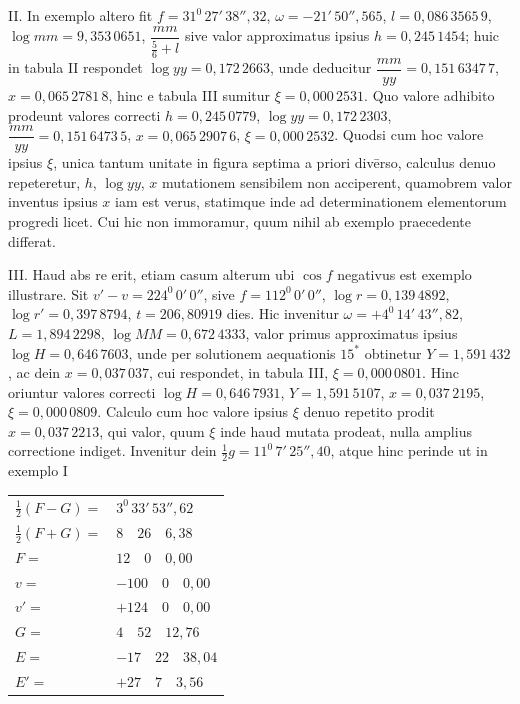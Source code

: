 II. In exemplo altero fit $f=31^0\,27'\,38''{,}32$, $\omega=-21'\,50''{,}565$, $l=0{,}086\,3565\,9$, $\log mm=9{,}353\,0651$, $\dfrac{mm}{\frac56+l}$ sive valor approximatus ipsius $h=0{,}245\,1454$; huic in tabula II respondet $\log yy=0{,}172\,2663$, unde deducitur $\dfrac{mm}{yy}=0{,}151\,6347\,7$, $x=0{,}065\,2781\,8$, hinc e tabula III sumitur $\xi=0{,}000\,2531$. Quo valore adhibito prodeunt valores correcti $h=0{,}245\,0779$, $\log yy=0{,}172\,2303$, $\dfrac{mm}{yy}=0{,}151\,6473\,5$, $x=0{,}065\,2907\,6$, $\xi=0{,}000\,2532$. Quodsi cum hoc valore ipsius $\xi$, unica tantum unitate in figura septima a priori div\={e}rso, calculus denuo repeteretur, $h$, $\log yy$, $x$ mutationem sensibilem non acciperent, quamobrem valor inventus ipsius $x$ iam est verus, statimque inde ad determinationem elementorum progredi licet. Cui hic non immoramur, quum nihil ab exemplo praecedente differat.

III. Haud abs re erit, etiam casum alterum ubi $\cos f$ negativus est exemplo illustrare. Sit $v'-v=224^0\,0'\,0''$, sive $f=112^0\,0'\,0''$, $\log r=0{,}139\,4892$, $\log r'=0{,}397\,8794$, $t=206{,}80919$ dies. Hic invenitur $\omega=+4^0\,14'\,43''{,}82$, $L=1{,}894\,2298$, $\log MM=0{,}672\,4333$, valor primus approximatus ipsius $\log H=0{,}646\,7603$, unde per solutionem aequationis $15^*$ obtinetur $Y=1{,}591\,432$, ac dein $x=0{,}037\,037$, cui respondet, in tabula III, $\xi=0{,}000\,0801$. Hinc oriuntur valores correcti $\log H=0{,}646\,7931$, $Y=1{,}591\,5107$, $x=0{,}037\,2195$, $\xi=0{,}000\,0809$. Calculo cum hoc valore ipsius $\xi$ denuo repetito prodit $x=0{,}037\,2213$, qui valor, quum $\xi$ inde haud mutata prodeat, nulla amplius correctione indiget. Invenitur dein $\tfrac12 g=11^0\,7'\,25''{,}40$, atque hinc perinde ut in exemplo I

\begin{center}
\begin{tabular}{@{}ll@{}}
$\tfrac12(F-G)=$ & $3^0\,33'\,53''{,}62$\\[.3em]
$\tfrac12(F+G)=$ & $8\quad26\quad6{,}38$\\[.3em]
$F=$ & $12\quad0\quad0{,}00$\\[.3em]
$v=$ & $-100\quad0\quad0{,}00$\\[.3em]
$v'=$ & $+124\quad0\quad0{,}00$\\[.3em]
$G=$ & $4\quad52\quad12{,}76$\\[.3em]
$E=$ & $-17\quad22\quad38{,}04$\\[.3em]
$E'=$ & $+27\quad7\quad3{,}56$\\[.3em]
\end{tabular}
\end{center}

